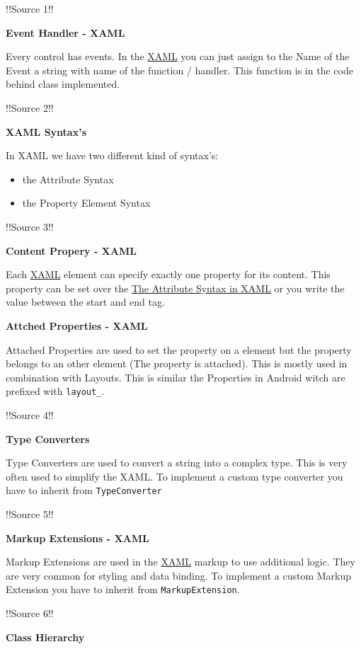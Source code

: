 \documentclass[10pt,twoside,landscape]{article}
\begin{document}
\begin{multicols}{3}
!!Source 1!!


\textbf{Event Handler - XAML}

Every control has events.
In the \href{../../../roam/20211123162058-xaml.org}{XAML} you can just assign to the Name of the Event a string with name of the function / handler.
This function is in the code behind class implemented.

!!Source 2!!


\textbf{XAML Syntax's}

In XAML we have two different kind of syntax's:
\begin{itemize}
\item the Attribute Syntax
\item the Property Element Syntax
\end{itemize}

!!Source 3!!

\textbf{Content Propery - XAML}

Each \href{../../../roam/20211123162058-xaml.org}{XAML} element can specify exactly one property for its content.
This property can be set over the \href{../../../roam/20211207160947-the_attribute_syntax_in_xaml.org}{The Attribute Syntax in XAML} or you write the value between the start and end tag.


\textbf{Attched Properties - XAML}

Attached Properties are used to set the property on a element but the property belongs to an other element (The property is attached).
This is mostly used in combination with Layouts.
This is similar the Properties in Android witch are prefixed with \texttt{layout\_}.

!!Source 4!!


\textbf{Type Converters}

Type Converters are used to convert a string into a complex type.
This is very often used to simplify the XAML.
To implement a custom type converter you have to inherit from \texttt{TypeConverter}

!!Source 5!!

\textbf{Markup Extensions - XAML}

Markup Extensions are used in the \href{../../../roam/20211123162058-xaml.org}{XAML} markup to use additional logic.
They are very common for styling and data binding.
To implement a custom Markup Extension you have to inherit from \texttt{MarkupExtension}.

!!Source 6!!

\textbf{Class Hierarchy}


\end{multicols}
\end{document}
